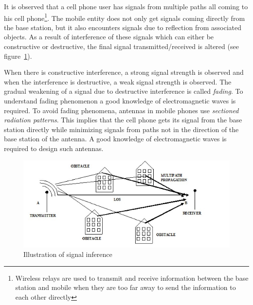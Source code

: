 It is observed that a cell phone user has signals from multiple paths all coming to his cell phone\footnote{Wireless relays are used to transmit and receive information between the base station and mobile when they are too far away to send the information to each other directly}. The mobile entity does not only get signals coming directly from the base station, but it also encounters signals due to reflection from associated objects. As a result of interference of these signals which can either be constructive or destructive, the final signal transmitted/received is altered (see figure~\ref{fig:rod}). 

When there is constructive interference, a strong signal strength is observed and when the interference is destructive, a weak signal strength is observed. The gradual weakening of a signal due to destructive interference is called \textit{fading}. To understand fading phenomenon a good knowledge of electromagnetic waves is required. To avoid fading phenomena, antennas in mobile phones use \textit{sectioned radiation patterns}. This implies that the cell phone gets its signal from the base station directly while minimizing signals from paths not in the direction of the base station of the antenna. A good knowledge of electromagnetic waves is required to design such antennas.
\begin{figure}[h]
\centering
\includegraphics[scale=0.4]{./graphics/rod}
\caption{Illustration of signal inference}
\label{fig:rod}
\end{figure}

